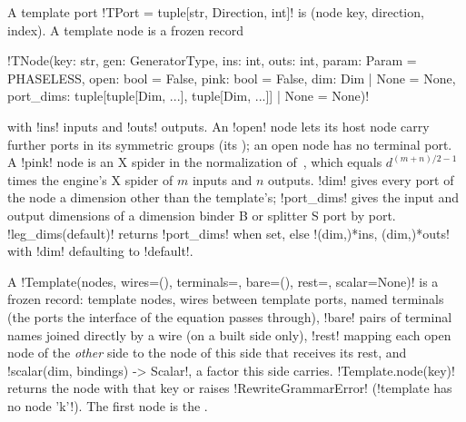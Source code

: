 \begin{definition}\label{def:rewriting-template}
A template port \py!TPort = tuple[str, Direction, int]! is (node key, direction, index). A
template node is a frozen record
\begin{signature}
\py!TNode(key: str, gen: GeneratorType, ins: int, outs: int, param: Param = PHASELESS, open: bool = False, pink: bool = False, dim: Dim | None = None, port_dims: tuple[tuple[Dim, ...], tuple[Dim, ...]] | None = None)!
\end{signature}
with \py!ins! inputs and \py!outs! outputs. An \py!open! node lets its host node carry further
ports in its symmetric groups (its ); an open node has no terminal port. A \py!pink!
node is an X spider in the normalization of~\cite{poor2023zxw}, which equals
$d^{(m+n)/2-1}$ times the engine's X spider of $m$ inputs and $n$ outputs. \py!dim! gives every
port of the node a dimension other than the template's; \py!port_dims! gives the input and
output dimensions of a dimension binder B or splitter S port by port.
\py!leg_dims(default)! returns \py!port_dims! when set, else \py!(dim,)*ins, (dim,)*outs! with
\py!dim! defaulting to \py!default!.

A \py!Template(nodes, wires=(), terminals={}, bare=(), rest={}, scalar=None)! is a frozen
record: template nodes, wires between template ports, named terminals (the ports the interface of
the equation passes through), \py!bare! pairs of terminal names joined directly by a wire (on a
built side only), \py!rest! mapping each open node of the \emph{other} side to the node of this
side that receives its rest, and \py!scalar(dim, bindings) -> Scalar!, a factor this side carries.
\py!Template.node(key)! returns the node with that key or raises \py!RewriteGrammarError!
(\code!template has no node 'k'!). The first node is the .
\end{definition}

